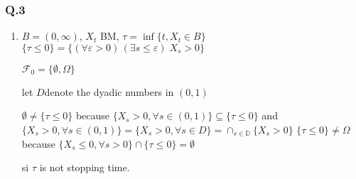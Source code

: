 \documentclass[12pt]{article}
\newcommand{\Q}[1]{\subsubsection*{Q.#1}}
\begin{document}
\Q{3}
\begin{enumerate}
  \begin{enumerate}
  \item
    $\{ \tau \le t \} = \cap_{\varepsilon > 0} \underbrace{\{ \exists s \le t + \varepsilon, X_s \in B \}}_{U_{t+\varepsilon}}$,
    $U_t = \{ \exists s \le t, X_s \in B \} \in \mathcal F_t$:
    \begin{itemize}
    \item $U_t = \cup_{s \le t} \{X_s \in B \} = \cup_{s \le t, s \in \mathbb Q} \{ X_s \in B \}$. Indeed,
      Let $\omega \in \{ X_s \in B \}$ for some $s \le t$. Since $B$ is open there exist $\alpha > 0$
      such that $\mathcal B(X_s(\omega), \alpha) \subset B$.
      By continuity of $X_s$, there exist $s' \in \mathbb Q$ smaller than $t$ such that $|X_s(\omega) - X_{s'}(\omega)| < \alpha$,
      therefore $\omega \in \{ X_{s'} \in B\}$
    \item $\cup_{s \le t, s \in \mathbb Q} \{ X_s \in B \} \in \mathcal F_t$ as a countable union of sets in $\mathcal F_t$.
    \end{itemize}
    Let $a > 0$
    $(U_{t + \varepsilon})_{\varepsilon > 0}$ is non-decreasing sequence. So $\cap_{\varepsilon > 0} U_{t + \varepsilon} \subseteq U_{t + a} \in \mathcal F_{t+a}$,
    Therefore $\cap_{\varepsilon > 0} U_{t + \varepsilon} \cap_{\varepsilon > 0} \mathcal F_{t+\varepsilon}$
    Since the filtration satisfies the usual conditions, $\{\tau \le t\} = \cap_{\varepsilon > 0} U_{t + \varepsilon}  \in \mathcal F_t$ and $\tau$ is a stopping times.
  \end{enumerate}
\item
  $B = (0, \infty)$, $X_t$ BM, $\tau = \inf \{ t , X_t \in B\}$
  $\{\tau \le 0\} = \{ (\forall \varepsilon > 0)\,(\exists s \le \varepsilon) \; X_s > 0 \}$
  
  $\mathcal F_0 = \{ \emptyset, \Omega \}$

  let $D$denote the dyadic numbers in $(0, 1)$
  
  $\emptyset \ne \{\tau \le 0\}$ because $\{ X_s > 0, \forall s \in (0, 1)\} \subseteq \{\tau \le 0\}$ and $\{ X_s > 0, \forall s \in (0, 1)\} = \{ X_s > 0, \forall s \in D \} = \cap_{s \in \mathbb D} \{ X_s > 0 \}$
  $ \{\tau \le 0\} \ne \Omega$ because $\{ X_s \le 0, \forall s > 0\} \cap \{\tau \le 0\} = \emptyset$

  si $\tau$ is not stopping time.
  
\end{enumerate}
\end{document}
